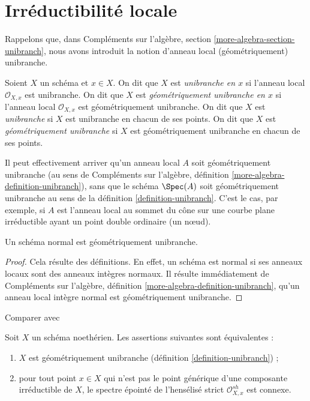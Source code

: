 \section{Irréductibilité locale}
\label{section-unibranch}

\noindent
Rappelons que, dans Compléments sur l'algèbre, section \ref{more-algebra-section-unibranch},
nous avons introduit la notion d'anneau local (géométriquement) unibranche.

\begin{definition}
\label{definition-unibranch}
\begin{reference}
\cite[Chapter IV (6.15.1)]{EGA4}
\end{reference}
Soient $X$ un schéma et $x \in X$. On dit que $X$ est {\it unibranche en $x$}
si l'anneau local $\mathcal{O}_{X, x}$ est unibranche. On dit que $X$ est
{\it géométriquement unibranche en $x$}
si l'anneau local $\mathcal{O}_{X, x}$ est géométriquement unibranche.
On dit que $X$ est {\it unibranche} si $X$ est unibranche en chacun de ses points.
On dit que $X$ est {\it géométriquement unibranche} si $X$ est
géométriquement unibranche en chacun de ses points.
\end{definition}

\noindent
Il peut effectivement arriver qu'un anneau local $A$ soit géométriquement unibranche
(au sens de
Compléments sur l'algèbre, définition \ref{more-algebra-definition-unibranch}),
sans que le schéma $\Spec(A)$ soit géométriquement unibranche au sens
de la définition \ref{definition-unibranch}. C'est le cas, par exemple,
si $A$ est l'anneau local au sommet du cône sur une courbe plane
irréductible ayant un point double ordinaire (un nœud).

\begin{lemma}
\label{lemma-normal-geometrically-unibranch}
Un schéma normal est géométriquement unibranche.
\end{lemma}

\begin{proof}
Cela résulte des définitions. En effet, un schéma
est normal si ses anneaux locaux sont des anneaux intègres normaux. Il résulte immédiatement
de Compléments sur l'algèbre, définition \ref{more-algebra-definition-unibranch},
qu'un anneau local intègre normal est géométriquement unibranche.
\end{proof}

\begin{lemma}
\label{lemma-geometrically-unibranch}
\begin{reference}
Comparer avec \cite[Proposition 2.3]{Etale-coverings}
\end{reference}
Soit $X$ un schéma noethérien. Les assertions suivantes sont équivalentes :
\begin{enumerate}
\item $X$ est géométriquement unibranche (définition \ref{definition-unibranch}) ;
\item pour tout point $x \in X$ qui n'est pas le point générique d'une
composante irréductible de $X$, le spectre épointé de
l'hensélisé strict $\mathcal{O}_{X, x}^{sh}$ est connexe.
\end{enumerate}
\end{lemma}

